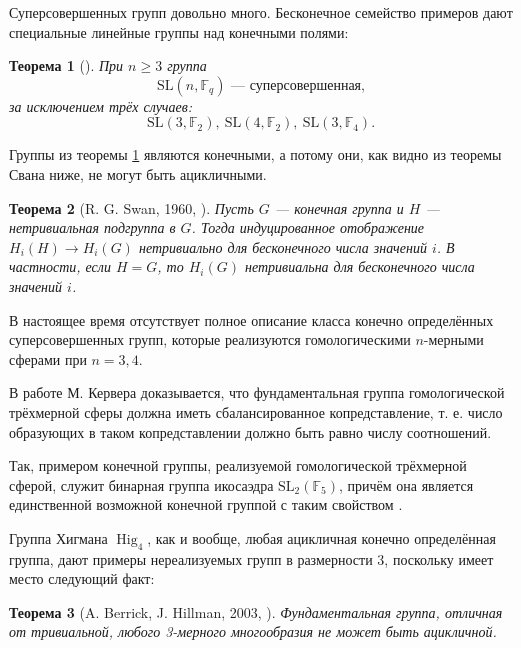 \documentclass[14pt, dvipsnames, twoside]{extarticle}
\newtheorem{theorem}{Теорема}
\theoremstyle{definition}
\theoremstyle{remark}
\DeclareMathOperator{\Hig}{\mathrm{Hig}}
\begin{document}
Суперсовершенных групп довольно много. Бесконечное семейство примеров дают специальные линейные группы над конечными полями:

\begin{theorem}[\cite{Milnor}]\label{Milnor}
При $n\geqslant 3$ группа $$\mathrm{SL}(n, \mathbb{F}_q)\text{ --- суперсовершенная,}$$ за исключением трёх случаев: $$\mathrm{SL}(3, \mathbb{F}_2),\ \mathrm{SL}(4, \mathbb{F}_2), \ \mathrm{SL}(3, \mathbb{F}_4).$$
\end{theorem} 


Группы из теоремы \ref{Milnor} являются конечными, а потому они, как видно из теоремы Свана ниже, не могут быть ацикличными. 

\begin{theorem}[R. G. Swan, 1960, \cite{Swan}]\label{Swan}
Пусть $G$ --- конечная группа и $H$ --- нетривиальная подгруппа в $G$. Тогда индуцированное отображение $H_i(H)\to H_i(G)$ нетривиально для бесконечного числа значений $i$. В частности, если $H = G$, то $H_i(G)$ нетривиальна для бесконечного числа значений $i$. 
\end{theorem}

В настоящее время отсутствует полное описание класса конечно определённых суперсовершенных групп, которые реализуются гомологическими $n$-мерными сферами при $n = 3, 4$. 

В работе М. Кервера доказывается, что фундаментальная группа гомологической трёхмерной сферы должна иметь сбалансированное копредставление, т. е. число образующих в таком копредставлении должно быть равно числу соотношений. 

Так, примером конечной группы, реализуемой гомологической трёхмерной сферой, служит бинарная группа икосаэдра $\mathrm{SL}_2(\mathbb{F}_5)$, причём она является единственной возможной конечной группой с таким свойством \cite{Kervaire}. 

Группа Хигмана $\Hig_4$, как и вообще, любая ацикличная конечно определённая группа, дают примеры нереализуемых групп в размерности 3, поскольку имеет место следующий факт:

\begin{theorem}[A. Berrick, J. Hillman, 2003, \cite{BerrickHillman}]
Фундаментальная группа, отличная от тривиальной, любого 3-мерного многообразия не может быть ацикличной.
\end{theorem}
\end{document}
